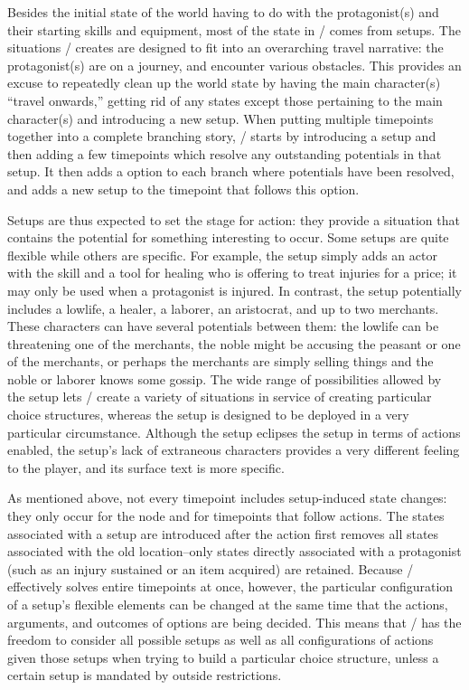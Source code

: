 Besides the initial state of the world having to do with the protagonist(s) and their starting skills and equipment, most of the state in \dunyazad/ comes from setups.
%
The situations \dunyazad/ creates are designed to fit into an overarching travel narrative: the protagonist(s) are on a journey, and encounter various obstacles.
%
This provides an excuse to repeatedly clean up the world state by having the main character(s) ``travel onwards,'' getting rid of any states except those pertaining to the main character(s) and introducing a new setup.
%
When putting multiple timepoints together into a complete branching story, \dunyazad/ starts by introducing a setup and then adding a few timepoints which resolve any outstanding potentials in that setup.
%
It then adds a  option to each branch where potentials have been resolved, and adds a new setup to the timepoint that follows this option.


Setups are thus expected to set the stage for action: they provide a situation that contains the potential for something interesting to occur.
%
Some setups are quite flexible while others are specific.
%
For example, the  setup simply adds an actor with the  skill and a tool for healing who is offering to treat injuries for a price; it may only be used when a protagonist is injured.
%
In contrast, the  setup potentially includes a lowlife, a healer, a laborer, an aristocrat, and up to two merchants.
%
These characters can have several potentials between them: the lowlife can be threatening one of the merchants, the noble might be accusing the peasant or one of the merchants, or perhaps the merchants are simply selling things and the noble or laborer knows some gossip.
%
The wide range of possibilities allowed by the  setup lets \dunyazad/ create a variety of situations in service of creating particular choice structures, whereas the  setup is designed to be deployed in a very particular circumstance.
%
Although the  setup eclipses the  setup in terms of actions enabled, the  setup's lack of extraneous characters provides a very different feeling to the player, and its surface text is more specific.


As mentioned above, not every timepoint includes setup-induced state changes: they only occur for the  node and for timepoints that follow  actions.
%
The states associated with a setup are introduced after the  action first removes all states associated with the old location--only states directly associated with a protagonist (such as an injury sustained or an item acquired) are retained.
%
Because \dunyazad/ effectively solves entire timepoints at once, however, the particular configuration of a setup's flexible elements can be changed at the same time that the actions, arguments, and outcomes of options are being decided.
%
This means that \dunyazad/ has the freedom to consider all possible setups as well as all configurations of actions given those setups when trying to build a particular choice structure, unless a certain setup is mandated by outside restrictions.


